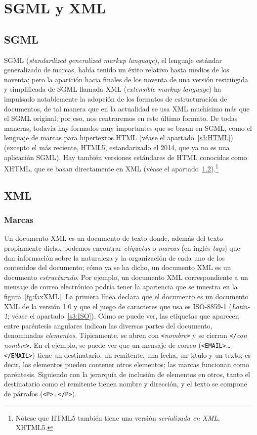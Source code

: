 \section{SGML y XML} \label{s3:SGML} \label{ss:SGML} 

\subsection{SGML} SGML (\emph{standardized generalized markup language}), el lenguaje estándar generalizado de marcas, había tenido un éxito relativo hasta medios de los noventa; pero la aparición hacia finales de los noventa de una versión restringida y simplificada de SGML llamada XML (\emph{extensible markup language}) ha impulsado notablemente la adopción de los formatos de estructuración de documentos, de tal manera que en la actualidad se usa XML muchísimo más que el SGML original; por eso, nos centraremos en este último formato. De todas maneras, todavía hay formados muy importantes que se basan en SGML, como el lenguaje de marcas para hipertextos HTML (véase el apartado~\ref{s3:HTML}) (excepto el más reciente, HTML5, estandarizado el 2014, que ya no es una aplicación SGML). Hay también versiones estándares de HTML conocidas como XHTML, que se basan directamente en XML (véase el apartado~\ref{s3:XML}).\footnote{Nótese que HTML5 también tiene una versión \emph{serializada en XML}, XHTML5.} 

\subsection{XML} \label{s3:XML} 

\subsubsection{Marcas} Un documento XML es un documento de texto donde, además del texto propiamente dicho, podemos encontrar \emph{etiquetas} o \emph{marcas} (en inglés \emph{tags}) que dan información sobre la naturaleza y la organización de cada uno de los contenidos del documento; cómo ya se ha dicho, un documento XML es un documento \emph{estructurado}. Por ejemplo, un documento XML correspondiente a un mensaje de correo electrónico podría tener la apariencia que se muestra en la figura~\ref{fg:faxXML}. La primera línea declara que el documento es un documento XML de la versión 1.0 y que el juego de caracteres que usa es ISO-8859-1 (\emph{Latin-1}; véase el apartado~\ref{s3:ISO}). Cómo se  puede ver, las etiquetas que aparecen entre paréntesis angulares indican las diversas partes del documento, denominadas \emph{elementos}. Típicamente, se abren con \texttt{<}\emph{nombre}\texttt{>} y se cierran \texttt{</}\emph{con nombre}\texttt{>}. En el ejemplo, se puede ver que un mensaje de correo (\texttt{<EMAIL>}\ldots\texttt{</EMAIL>}) tiene un destinatario, un remitente, una fecha, un título y un texto; es decir, los elementos pueden contener otros elementos; las marcas funcionan como paréntesis. Siguiendo con la jerarquía de inclusión de elementos en otros, tanto el destinatario como el remitente tienen nombre y dirección, y el texto se compone de párrafos (\texttt{<P>}\ldots\texttt{</P>}). 

